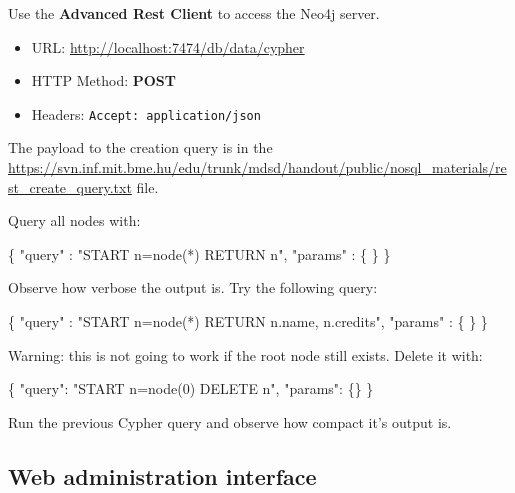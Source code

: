 \documentclass[]{report}
\newenvironment{Shaded}{}{}
\newcommand{\DataTypeTok}[1]{\textcolor[rgb]{0.56,0.13,0.00}{{#1}}}
\newcommand{\StringTok}[1]{\textcolor[rgb]{0.25,0.44,0.63}{{#1}}}
\newcommand{\NormalTok}[1]{{#1}}
\begin{document}
Use the \textbf{Advanced Rest Client} to access the Neo4j server.

\begin{itemize}
\itemsep1pt\parskip0pt
\item
  URL: \url{http://localhost:7474/db/data/cypher}
\item
  HTTP Method: \textbf{POST}
\item
  Headers: \texttt{Accept: application/json}
\end{itemize}

The payload to the creation query is in the
\url{https://svn.inf.mit.bme.hu/edu/trunk/mdsd/handout/public/nosql_materials/rest_create_query.txt}
file.

Query all nodes with:

\begin{Shaded}
\begin{Highlighting}[]
\NormalTok{\{}
  \DataTypeTok{"query"} \NormalTok{: }\StringTok{"START n=node(*) RETURN n"}\NormalTok{,}
  \DataTypeTok{"params"} \NormalTok{: \{}
  \NormalTok{\}}
\NormalTok{\}}
\end{Highlighting}
\end{Shaded}

Observe how verbose the output is. Try the following query:

\begin{Shaded}
\begin{Highlighting}[]
\NormalTok{\{}
  \DataTypeTok{"query"} \NormalTok{: }\StringTok{"START n=node(*) RETURN n.name, n.credits"}\NormalTok{,}
  \DataTypeTok{"params"} \NormalTok{: \{}
  \NormalTok{\}}
\NormalTok{\}}
\end{Highlighting}
\end{Shaded}

Warning: this is not going to work if the root node still exists. Delete
it with:

\begin{Shaded}
\begin{Highlighting}[]
\NormalTok{\{}
  \DataTypeTok{"query"}\NormalTok{: }\StringTok{"START n=node(0) DELETE n"}\NormalTok{,}
  \DataTypeTok{"params"}\NormalTok{: \{\}}
\NormalTok{\}}
\end{Highlighting}
\end{Shaded}

Run the previous Cypher query and observe how compact it's output is.

\subsection{Web administration interface}
\end{document}
